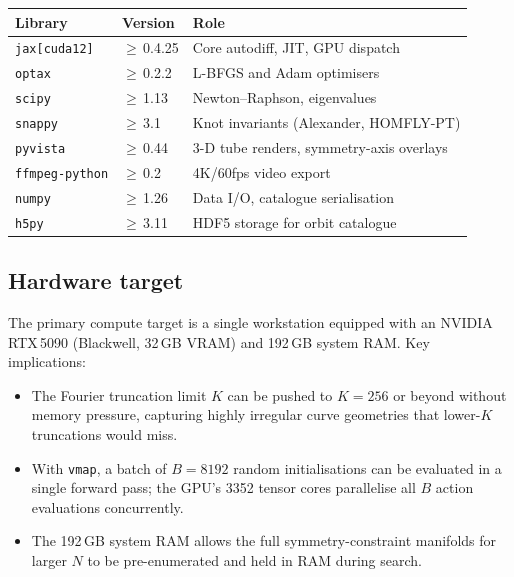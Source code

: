 \documentclass[12pt, a4paper]{article}
\theoremstyle{definition}
\begin{document}
\begin{center}
\begin{tabular}{lll}
\toprule
\textbf{Library} & \textbf{Version} & \textbf{Role} \\
\midrule
\texttt{jax[cuda12]} & $\geq$\,0.4.25 & Core autodiff, JIT, GPU dispatch \\
\texttt{optax}       & $\geq$\,0.2.2  & L-BFGS and Adam optimisers \\
\texttt{scipy}       & $\geq$\,1.13   & Newton--Raphson, eigenvalues \\
\texttt{snappy}      & $\geq$\,3.1    & Knot invariants (Alexander, HOMFLY-PT) \\
\texttt{pyvista}     & $\geq$\,0.44   & 3-D tube renders, symmetry-axis overlays \\
\texttt{ffmpeg-python} & $\geq$\,0.2  & 4K/60fps video export \\
\texttt{numpy}       & $\geq$\,1.26   & Data I/O, catalogue serialisation \\
\texttt{h5py}        & $\geq$\,3.11   & HDF5 storage for orbit catalogue \\
\bottomrule
\end{tabular}
\end{center}

\subsection{Hardware target}

The primary compute target is a single workstation equipped with an NVIDIA
RTX\,5090 (Blackwell, 32\,GB VRAM) and 192\,GB system RAM.  Key
implications:

\begin{itemize}[leftmargin=1.8em]
  \item The Fourier truncation limit $K$ can be pushed to $K = 256$ or beyond
        without memory pressure, capturing highly irregular curve geometries
        that lower-$K$ truncations would miss.
  \item With \texttt{vmap}, a batch of $B = 8192$ random initialisations can be
        evaluated in a single forward pass; the GPU's 3352 tensor cores
        parallelise all $B$ action evaluations concurrently.
  \item The 192\,GB system RAM allows the full symmetry-constraint manifolds for
        larger $N$ to be pre-enumerated and held in RAM during search.
\end{itemize}

\end{document}
